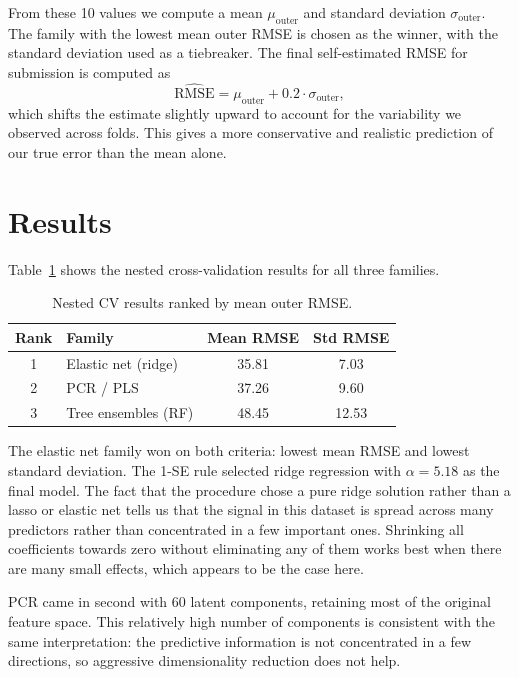 \documentclass{article}
\begin{document}
From these 10 values we compute a mean $\mu_{\text{outer}}$ and standard deviation $\sigma_{\text{outer}}$. The family with the lowest mean outer RMSE is chosen as the winner, with the standard deviation used as a tiebreaker. The final self-estimated RMSE for submission is computed as
\[
  \widehat{\text{RMSE}} = \mu_{\text{outer}} + 0.2 \cdot \sigma_{\text{outer}},
\]
which shifts the estimate slightly upward to account for the variability we observed across folds. This gives a more conservative and realistic prediction of our true error than the mean alone.

\section*{Results}

Table~\ref{tab:leaderboard} shows the nested cross-validation results for all three families.

\begin{table}[h]
\centering
\caption{Nested CV results ranked by mean outer RMSE.}
\label{tab:leaderboard}
\begin{tabular}{@{}clcc@{}}
\toprule
Rank & Family & Mean RMSE & Std RMSE \\
\midrule
1 & Elastic net (ridge) & 35.81 & 7.03 \\
2 & PCR / PLS           & 37.26 & 9.60 \\
3 & Tree ensembles (RF) & 48.45 & 12.53 \\
\bottomrule
\end{tabular}
\end{table}

The elastic net family won on both criteria: lowest mean RMSE and lowest standard deviation. The 1-SE rule selected ridge regression with $\alpha = 5.18$ as the final model. The fact that the procedure chose a pure ridge solution rather than a lasso or elastic net tells us that the signal in this dataset is spread across many predictors rather than concentrated in a few important ones. Shrinking all coefficients towards zero without eliminating any of them works best when there are many small effects, which appears to be the case here.

PCR came in second with 60 latent components, retaining most of the original feature space. This relatively high number of components is consistent with the same interpretation: the predictive information is not concentrated in a few directions, so aggressive dimensionality reduction does not help.
\end{document}
